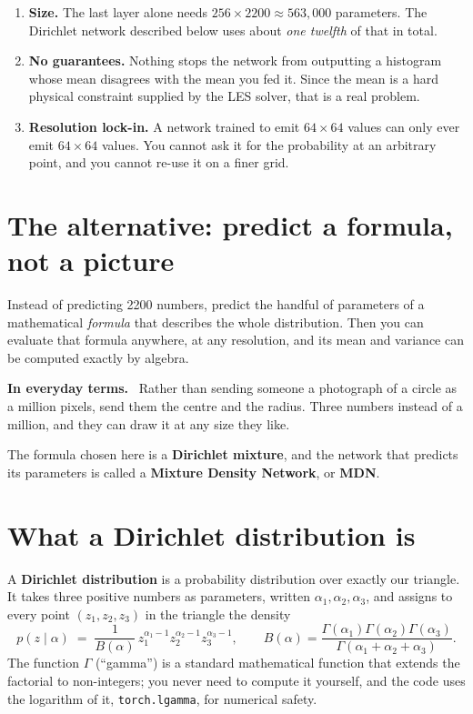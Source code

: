 \documentclass[11pt,a4paper]{report}
\newcommand{\code}[1]{\texttt{#1}}
\newcommand{\term}[1]{\textbf{#1}}
\renewcommand{\_}{\origtextunderscore\allowbreak}
\newlength{\calloutwidth}
\newcommand{\calloutOpen}{%
  \par\medskip\noindent
  \setlength{\calloutwidth}{\dimexpr\linewidth-2\fboxsep\relax}%
  \begin{lrbox}{\calloutbox}\begin{minipage}{\calloutwidth}}
\newcommand{\calloutClose}[1]{%
  \end{minipage}\end{lrbox}\colorbox{#1}{\usebox{\calloutbox}}\par\medskip}
\newenvironment{analogy}
  {\calloutOpen\textbf{In everyday terms.}\ }
  {\calloutClose{BoxBG}}
\begin{document}
\begin{enumerate}
  \item \textbf{Size.} The last layer alone needs $256 \times 2200 \approx 563{,}000$
        parameters. The Dirichlet network described below uses about \emph{one twelfth} of
        that in total.
  \item \textbf{No guarantees.} Nothing stops the network from outputting a histogram whose
        mean disagrees with the mean you fed it. Since the mean is a hard physical constraint
        supplied by the LES solver, that is a real problem.
  \item \textbf{Resolution lock-in.} A network trained to emit $64\times64$ values can only
        ever emit $64\times64$ values. You cannot ask it for the probability at an arbitrary
        point, and you cannot re-use it on a finer grid.
\end{enumerate}

\section{The alternative: predict a formula, not a picture}

Instead of predicting 2200 numbers, predict the handful of parameters of a mathematical
\emph{formula} that describes the whole distribution. Then you can evaluate that formula
anywhere, at any resolution, and its mean and variance can be computed exactly by algebra.

\begin{analogy}
Rather than sending someone a photograph of a circle as a million pixels, send them the
centre and the radius. Three numbers instead of a million, and they can draw it at any size
they like.
\end{analogy}

The formula chosen here is a \term{Dirichlet mixture}, and the network that predicts its
parameters is called a \term{Mixture Density Network}, or \term{MDN}.

\section{What a Dirichlet distribution is}

A \term{Dirichlet distribution} is a probability distribution over exactly our triangle. It
takes three positive numbers as parameters, written $\alpha_1, \alpha_2, \alpha_3$, and
assigns to every point $(z_1, z_2, z_3)$ in the triangle the density
\[
  p(z \mid \alpha) \;=\; \frac{1}{B(\alpha)} \, z_1^{\alpha_1 - 1} z_2^{\alpha_2 - 1} z_3^{\alpha_3 - 1},
  \qquad
  B(\alpha) = \frac{\Gamma(\alpha_1)\Gamma(\alpha_2)\Gamma(\alpha_3)}{\Gamma(\alpha_1 + \alpha_2 + \alpha_3)} .
\]
The function $\Gamma$ (``gamma'') is a standard mathematical function that extends the
factorial to non-integers; you never need to compute it yourself, and the code uses the
logarithm of it, \code{torch.lgamma}, for numerical safety.
\end{document}
